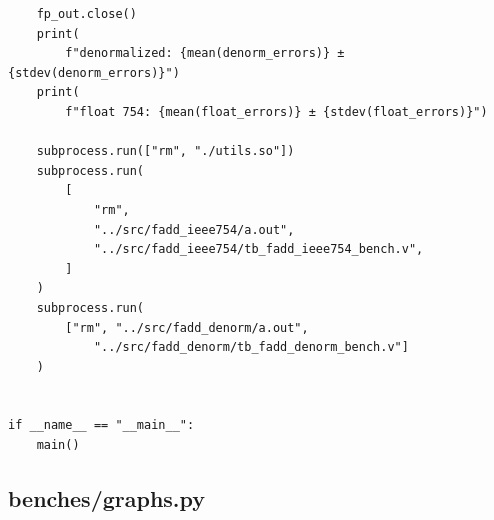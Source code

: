\documentclass{article}
\begin{document}
\begin{lstlisting}
    fp_out.close()
    print(
        f"denormalized: {mean(denorm_errors)} ± {stdev(denorm_errors)}")
    print(
        f"float 754: {mean(float_errors)} ± {stdev(float_errors)}")

    subprocess.run(["rm", "./utils.so"])
    subprocess.run(
        [
            "rm",
            "../src/fadd_ieee754/a.out",
            "../src/fadd_ieee754/tb_fadd_ieee754_bench.v",
        ]
    )
    subprocess.run(
        ["rm", "../src/fadd_denorm/a.out",
            "../src/fadd_denorm/tb_fadd_denorm_bench.v"]
    )


if __name__ == "__main__":
    main()
\end{lstlisting}

\subsection{benches/graphs.py}
\end{document}
